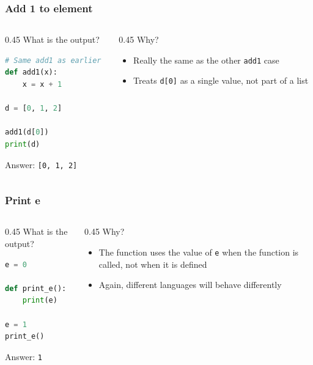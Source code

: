 \documentclass[aspectratio=169,hyperref={bookmarks=false,urlcolor=blue,colorlinks=true},10pt]{beamer}
\begin{document}
\begin{frame}[fragile]
  \frametitle{Add 1 to element}

  \begin{columns}[t]
    \begin{column}{0.45\textwidth}
      What is the output?

      \begin{lstlisting}[language=Python]
# Same add1 as earlier
def add1(x):
    x = x + 1

d = [0, 1, 2]

add1(d[0])
print(d)
      \end{lstlisting}

      \pause

      Answer: \texttt{[0, 1, 2]}
    \end{column}
    \begin{column}{0.45\textwidth}
      Why?

      \pause

      \begin{itemize}
      \item Really the same as the other \texttt{add1} case
      \item Treats \texttt{d[0]} as a single value, not part of a list
      \end{itemize}
    \end{column}
  \end{columns}
\end{frame}

\begin{frame}[fragile]
  \frametitle{Print e}

  \begin{columns}[t]
    \begin{column}{0.45\textwidth}
      What is the output?

      \begin{lstlisting}[language=Python]
e = 0

def print_e():
    print(e)

e = 1
print_e()
      \end{lstlisting}

      \pause

      Answer: \texttt{1}
    \end{column}
    \begin{column}{0.45\textwidth}
      Why?

      \pause

      \begin{itemize}
      \item The function uses the value of \texttt{e} when the function is called, not when it is
        defined
      \item Again, different languages will behave differently
      \end{itemize}
    \end{column}
  \end{columns}
\end{frame}
\end{document}
